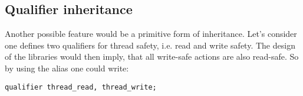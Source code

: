 \subsection{Qualifier inheritance}
Another possible feature would be a primitive form of inheritance. Let's consider one defines two qualifiers for thread safety, i.e. read and write safety. The design of the libraries would then imply, that all write-safe actions are also read-safe. So by using the alias one could write:
\begin{lstlisting}
qualifier thread_read, thread_write; 
\end{lstlisting} 
